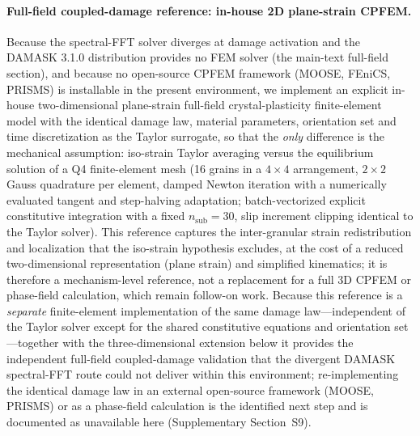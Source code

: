 \documentclass[11pt,a4paper,twocolumn]{article}
\begin{document}
\paragraph{Full-field coupled-damage reference: in-house 2D plane-strain CPFEM.}
Because the spectral-FFT solver diverges at damage activation and the DAMASK 3.1.0 distribution provides no FEM solver (the main-text full-field section), and because no open-source CPFEM framework (MOOSE, FEniCS, PRISMS) is installable in the present environment, we implement an explicit in-house two-dimensional plane-strain full-field crystal-plasticity finite-element model with the identical damage law, material parameters, orientation set and time discretization as the Taylor surrogate, so that the \emph{only} difference is the mechanical assumption: iso-strain Taylor averaging versus the equilibrium solution of a Q4 finite-element mesh (16 grains in a $4\times4$ arrangement, $2\times2$ Gauss quadrature per element, damped Newton iteration with a numerically evaluated tangent and step-halving adaptation; batch-vectorized explicit constitutive integration with a fixed $n_{\mathrm{sub}}=30$, slip increment clipping identical to the Taylor solver). This reference captures the inter-granular strain redistribution and localization that the iso-strain hypothesis excludes, at the cost of a reduced two-dimensional representation (plane strain) and simplified kinematics; it is therefore a mechanism-level reference, not a replacement for a full 3D CPFEM or phase-field calculation, which remain follow-on work. Because this reference is a \emph{separate} finite-element implementation of the same damage law---independent of the Taylor solver except for the shared constitutive equations and orientation set---together with the three-dimensional extension below it provides the independent full-field coupled-damage validation that the divergent DAMASK spectral-FFT route could not deliver within this environment; re-implementing the identical damage law in an external open-source framework (MOOSE, PRISMS) or as a phase-field calculation is the identified next step and is documented as unavailable here (Supplementary Section~S9).
\end{document}
